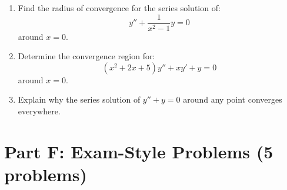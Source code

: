 \documentclass[12pt]{article}
\begin{document}
\begin{enumerate}[resume]
\item Find the radius of convergence for the series solution of:
$$y'' + \frac{1}{x^{2}-1}y = 0$$ around $x = 0$.

\item Determine the convergence region for:
$$(x^{2}+2x+5)y'' + xy' + y = 0$$ around $x = 0$.

\item Explain why the series solution of $y'' + y = 0$ around any point converges everywhere.
\end{enumerate}

\section*{Part F: Exam-Style Problems (5 problems)}
\end{document}
